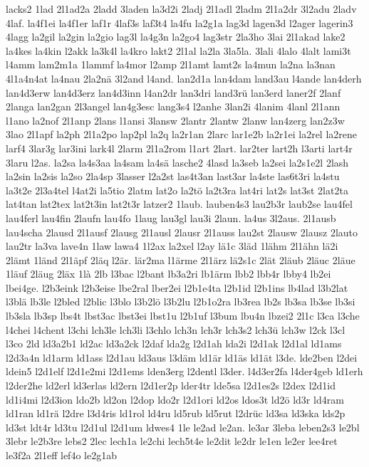{lacks2
1lad
2l1ad2a
2ladd
3laden
la3d2i
2ladj
2l1adl
2ladm
2l1a2dr
3l2adu
2ladv
4laf.
la4f1ei
la4f1er
laf1r
4laf3s
laf3t4
la4fu
la2g1a
lag3d
lagen3d
l2ager
lagerin3
4lagg
la2gil
la2gin
la2gio
lag3l
la4g3n
la2go4
lag3str
2la3ho
3lai
2l1akad
lake2
la4kes
la4kin
l2akk
la3k4l
la4kro
lakt2
2l1al
la2la
3la5la.
3lali
4lalo
4lalt
lami3t
l4amm
lam2m1a
1lammf
la4mor
l2amp
2l1amt
lamt2s
la4mun
la2na
la3nan
4l1a4n4at
la4nau
2la2nä
3l2and
l4and.
lan2d1a
lan4dam
land3au
l4ande
lan4derh
lan4d3erw
lan4d3erz
lan4d3inn
l4an2dr
lan3dri
land3rü
lan3erd
laner2f
2lanf
2langa
lan2gan
2l3angel
lan4g3esc
lang3s4
l2anhe
3lan2i
4lanim
4lanl
2l1ann
l1ano
la2nof
2l1anp
2lans
l1ansi
3lansw
2lantr
2lantw
2lanw
lan4zerg
lan2z3w
3lao
2l1apf
la2ph
2l1a2po
lap2pl
la2q
la2r1an
2larc
lar1e2b
la2r1ei
la2rel
la2rene
larf4
3lar3g
lar3ini
lark4l
2larm
2l1a2rom
l1art
2lart.
lar2ter
lart2h
l3arti
lart4r
3laru
l2as.
la2sa
la4s3aa
la4sam
la4sä
lasche2
4lasd
la3seb
la2sei
la2s1e2l
2lash
la2sin
la2sis
la2so
2la4sp
3lasser
l2a2st
las4t3an
last3ar
la4ste
las6t3ri
la4stu
la3t2e
2l3a4tel
l4at2i
la5tio
2latm
lat2o
la2tö
la2t3ra
lat4ri
lat2s
lat3st
2lat2ta
lat4tan
lat2tex
lat2t3in
lat2t3r
latzer2
1laub.
lauben4s3
lau2b3r
laub2se
lau4fel
lau4ferl
lau4fin
2laufn
lau4fo
1laug
lau3gl
lau3i
2laun.
la4us
3l2aus.
2l1ausb
lau4scha
2lausd
2l1ausf
2lausg
2l1ausl
2lausr
2l1auss
lau2st
2lausw
2lausz
2lauto
lau2tr
la3va
lave4n
1law
lawa4
1l2ax
la2xel
l2ay
lä1c
3läd
1lähm
2l1ähn
lä2i
2lämt
1länd
2l1äpf
2läq
l2är.
lär2ma
l1ärme
2l1ärz
lä2s1c
2lät
2läub
2läuc
2läue
1läuf
2läug
2läx
1là
2lb
l3bac
l2bant
lb3a2ri
lb1ärm
lbb2
lbb4r
lbby4
lb2ei
lbei4ge.
l2b3eink
l2b3eise
lbe2ral
lber2ei
l2b1e4ta
l2b1id
l2b1ins
lb4lad
l3b2lat
l3blä
lb3le
l2bled
l2blic
l3blo
l3b2lö
l3b2lu
l2b1o2ra
lb3rea
lb2s
lb3sa
lb3se
lb3si
lb3sla
lb3sp
lbs4t
lbst3ac
lbst3ei
lbst1u
l2b1uf
l3bum
lbu4n
lbzei2
2l1c
l3ca
l3che
l4chei
l4chent
l3chi
lch3le
lch3li
l3chlo
lch3n
lch3r
lch3s2
lch3ü
lch3w
l2ck
l3cl
l3co
2ld
ld3a2b1
ld2ac
ld3a2ck
l2daf
lda2g
l2d1ah
lda2i
l2d1ak
l2d1al
ld1ams
l2d3a4n
ld1arm
ld1ass
l2d1au
ld3aus
l3däm
ld1är
ld1äs
ld1ät
l3de.
lde2ben
l2dei
ldein5
l2d1elf
l2d1e2mi
l2d1ems
lden3erg
l2dentl
l3der.
l4d3er2fa
l4der4geb
ld1erh
l2der2he
ld2erl
ld3erlas
ld2ern
l2d1er2p
lder4tr
lde5sa
l2d1es2s
l2dex
l2d1id
ld1i4mi
l2d3ion
ldo2b
ld2on
l2dop
ldo2r
l2d1ori
ld2os
ldos3t
ld2ö
ld3r
ld4ram
ld1ran
ld1rä
l2dre
l3d4ris
ld1rol
ld4ru
ld5rub
ld5rut
l2drüc
ld3sa
ld3ska
lds2p
ld3st
ldt4r
ld3tu
l2d1ul
l2d1um
ldwes4
1le
le2ad
le2an.
le3ar
3leba
leben2s3
le2bl
3lebr
le2b3re
lebs2
2lec
lech1a
le2chi
lech5t4e
le2dit
le2dr
le1en
le2er
lee4ret
le3f2a
2l1eff
lef4o
le2g1ab
}
